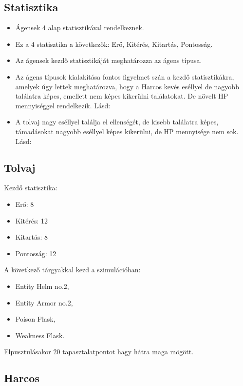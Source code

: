 \subsection{Statisztika}
\label{statisztika}
\begin{itemize}
    \item Ágensek 4 alap statisztikával rendelkeznek.
    \item Ez a 4 statisztika a következők: Erő, Kitérés, Kitartás, Pontosság.
    \item Az ágensek kezdő statisztikáját meghatározza az ágens típusa.
    \item Az ágens típusok kialakítása fontos figyelmet szán a kezdő statisztikákra, amelyek úgy lettek meghatározva, hogy a Harcos kevés eséllyel de nagyobb találatra képes, emellett nem képes kikerülni találatokat. De növelt HP mennyiséggel rendelkezik. Lásd: 
    \item A tolvaj nagy eséllyel találja el ellenségét, de kisebb találatra képes, támadásokat nagyobb eséllyel képes kikerülni, de HP mennyisége nem sok. Lásd: 
\end{itemize}

\subsection{Tolvaj}

\noindent Kezdő statisztika:
\begin{itemize}
    \item Erő: 8
    \item Kitérés: 12
    \item Kitartás: 8
    \item Pontosság: 12
\end{itemize}

\noindent A következő tárgyakkal kezd a szimulációban:

\begin{itemize}
    \item Entity Helm no.2,
    \item Entity Armor no.2,
    \item Poison Flask,
    \item Weakness Flask.
\end{itemize}

\noindent Elpusztulásakor 20 tapasztalatpontot hagy hátra maga mögött.

\subsection{Harcos}

